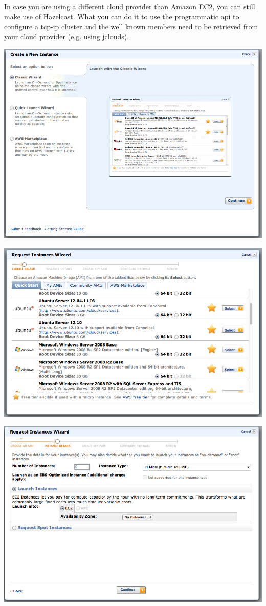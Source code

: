 In case you are using a different cloud provider than Amazon EC2, you can still make use of Hazelcast. What you can do it to use the programmatic api to configure a tcp-ip cluster and the well known members need to be retrieved from your cloud provider (e.g. using jclouds).

\includegraphics[scale=0.40]{ec2-1.png}

\includegraphics[scale=0.40]{ec2-2.png}

\includegraphics[scale=0.40]{ec2-3.png}

